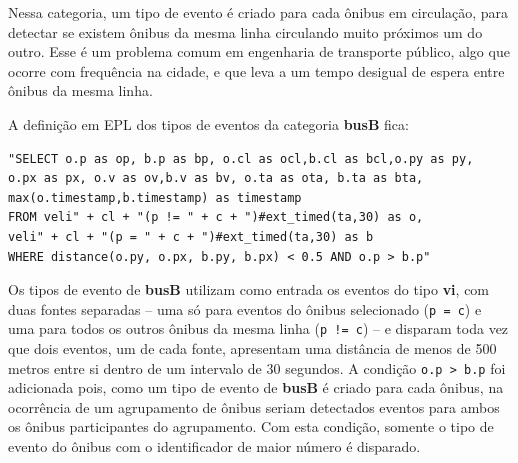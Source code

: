\begin{itemize}
Nessa categoria, um tipo de evento é criado para cada ônibus em circulação, para detectar se existem ônibus da mesma linha circulando muito próximos um do outro. 
Esse é um problema comum em engenharia de transporte público, algo que ocorre com frequência na cidade, e que leva a um tempo desigual de espera entre ônibus da mesma linha. 

A definição em EPL dos tipos de eventos da categoria \textbf{busB} fica: 
  
\begin{verbatim}
"SELECT o.p as op, b.p as bp, o.cl as ocl,b.cl as bcl,o.py as py,
o.px as px, o.v as ov,b.v as bv, o.ta as ota, b.ta as bta,
max(o.timestamp,b.timestamp) as timestamp 
FROM veli" + cl + "(p != " + c + ")#ext_timed(ta,30) as o,
veli" + cl + "(p = " + c + ")#ext_timed(ta,30) as b 
WHERE distance(o.py, o.px, b.py, b.px) < 0.5 AND o.p > b.p"
\end{verbatim}
Os tipos de evento de \textbf{busB} utilizam como entrada os eventos do tipo \textbf{vi}, com duas fontes separadas -- uma só para eventos do ônibus selecionado (\texttt{p = c}) e uma para todos os outros ônibus da mesma linha (\texttt{p != c}) -- e disparam toda vez que dois eventos, um de cada fonte, apresentam uma distância de menos de 500 metros entre si dentro de um intervalo de 30 segundos. A condição \texttt{o.p > b.p} foi adicionada pois, como um tipo de evento de \textbf{busB} é criado para cada ônibus, na ocorrência de um agrupamento de ônibus seriam detectados eventos para ambos os ônibus participantes do agrupamento. Com esta condição, somente o tipo de evento do ônibus com o identificador de maior número é disparado.

\end{itemize}





